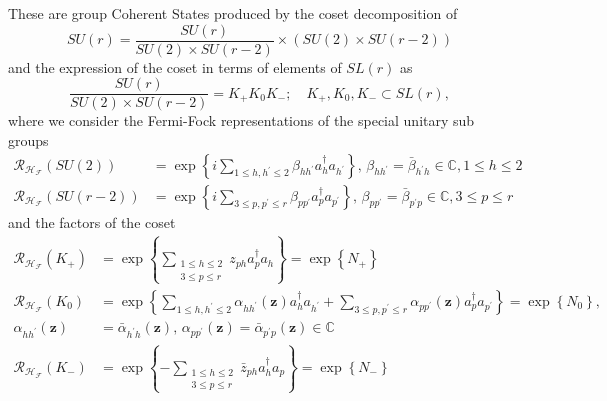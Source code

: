 \documentclass[aps,preprint]{revtex4}%
\begin{document}
These are group Coherent States produced by the coset decomposition of
\begin{equation}
SU\left(  r\right)  =\frac{SU\left(  r\right)  }{SU\left(  2\right)  \times
SU\left(  r-2\right)  }\times\left(  SU\left(  2\right)  \times SU\left(
r-2\right)  \right)
\end{equation}
and the expression of the coset in terms of elements of $SL\left(  r\right)  $
as
\begin{equation}
\frac{SU\left(  r\right)  }{SU\left(  2\right)  \times SU\left(  r-2\right)
}=K_{+}K_{0}K_{-};\quad K_{+},K_{0},K_{-}\subset SL\left(  r\right)  ,
\end{equation}
where we consider the Fermi-Fock representations of the special unitary sub
groups
\begin{align}
\mathcal{R}_{\mathcal{H}_{\mathcal{F}}}\left(  SU\left(  2\right)  \right)
&  =\exp\left\{  i\sum\limits_{1\leq h,h^{\prime}\leq2}\beta_{hh^{\prime}%
}a_{h}^{\dagger}a_{h^{\prime}}\right\}  ,\,\beta_{hh^{\prime}}=\bar{\beta
}_{h^{\prime}h}\in\mathbb{C},1\leq h\leq2\nonumber\\
\mathcal{R}_{\mathcal{H}_{\mathcal{F}}}\left(  SU\left(  r-2\right)  \right)
&  =\exp\left\{  i\sum\limits_{3\leq p,p^{\prime}\leq r}\beta_{pp^{\prime}%
}a_{p}^{\dagger}a_{p^{\prime}}\right\}  ,\,\beta_{pp^{\prime}}=\bar{\beta
}_{p^{\prime}p}\in\mathbb{C},3\leq p\leq r
\end{align}
and the factors of the coset%
\begin{align}
\mathcal{R}_{\mathcal{H}_{\mathcal{F}}}\left(  K_{+}\right)   &  =\exp\left\{
\sum\limits_{\substack{1\leq h\leq2\\3\leq p\leq r}}z_{ph}a_{p}^{\dagger}%
a_{h}\right\}  =\exp\left\{  N_{+}\right\}  \nonumber\\
\mathcal{R}_{\mathcal{H}_{\mathcal{F}}}\left(  K_{0}\right)   &  =\exp\left\{
\sum\limits_{1\leq h,h^{\prime}\leq2}\alpha_{hh^{\prime}}\left(
\mathbf{z}\right)  a_{h}^{\dagger}a_{h^{\prime}}+\sum\limits_{3\leq
p,p^{\prime}\leq r}\alpha_{pp^{\prime}}\left(  \mathbf{z}\right)
a_{p}^{\dagger}a_{p^{\prime}}\right\}  =\exp\left\{  N_{0}\right\}
,\,\nonumber\\
\alpha_{hh^{\prime}}\left(  \mathbf{z}\right)   &  =\bar{\alpha}_{h^{\prime}%
h}\left(  \mathbf{z}\right)  ,\,\alpha_{pp^{\prime}}\left(  \mathbf{z}\right)
=\bar{\alpha}_{p^{\prime}p}\left(  \mathbf{z}\right)  \in\mathbb{C}\nonumber\\
\mathcal{R}_{\mathcal{H}_{\mathcal{F}}}\left(  K_{-}\right)   &  =\exp\left\{
-\sum\limits_{\substack{1\leq h\leq2\\3\leq p\leq r}}\bar{z}_{ph}%
a_{h}^{\dagger}a_{p}\right\}  =\exp\left\{  N_{-}\right\}
\end{align}
\end{document}
